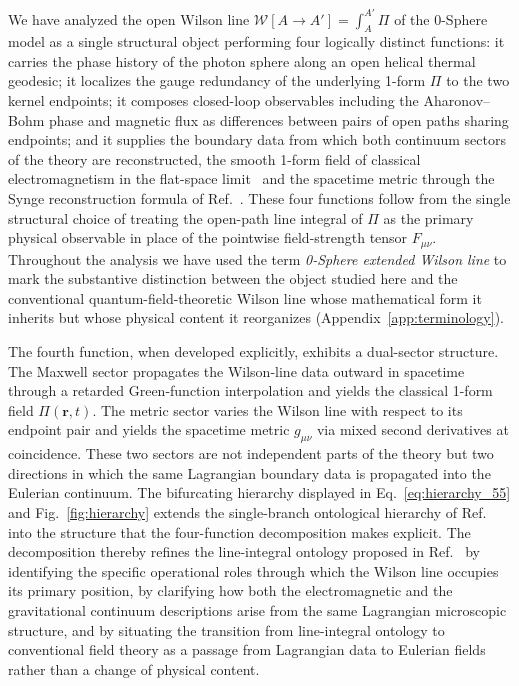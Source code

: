 \documentclass[%
 reprint, amsmath,amssymb, aps, prb, ]{revtex4-2}
\numberwithin{equation}{section}
\newcommand{\WL}{\mathcal{W}}
\begin{document}
We have analyzed the open Wilson line $\WL[A \to A'] = \int_A^{A'}\Pi$ of the 0-Sphere model as a single structural object performing four logically distinct functions: it carries the phase history of the photon sphere along an open helical thermal geodesic; it localizes the gauge redundancy of the underlying 1-form $\Pi$ to the two kernel endpoints; it composes closed-loop observables including the Aharonov--Bohm phase and magnetic flux as differences between pairs of open paths sharing endpoints; and it supplies the boundary data from which both continuum sectors of the theory are reconstructed, the smooth 1-form field of classical electromagnetism in the flat-space limit~\cite{hanamura54} and the spacetime metric through the Synge reconstruction formula of Ref.~\cite{hanamura51}. These four functions follow from the single structural choice of treating the open-path line integral of $\Pi$ as the primary physical observable in place of the pointwise field-strength tensor $F_{\mu\nu}$. Throughout the analysis we have used the term \emph{0-Sphere extended Wilson line} to mark the substantive distinction between the object studied here and the conventional quantum-field-theoretic Wilson line whose mathematical form it inherits but whose physical content it reorganizes (Appendix~\ref{app:terminology}).

The fourth function, when developed explicitly, exhibits a dual-sector structure. The Maxwell sector propagates the Wilson-line data outward in spacetime through a retarded Green-function interpolation and yields the classical 1-form field $\Pi(\mathbf{r},t)$. The metric sector varies the Wilson line with respect to its endpoint pair and yields the spacetime metric $g_{\mu\nu}$ via mixed second derivatives at coincidence. These two sectors are not independent parts of the theory but two directions in which the same Lagrangian boundary data is propagated into the Eulerian continuum. The bifurcating hierarchy displayed in Eq.~\eqref{eq:hierarchy_55} and Fig.~\ref{fig:hierarchy} extends the single-branch ontological hierarchy of Ref.~\cite{hanamura54} into the structure that the four-function decomposition makes explicit. The decomposition thereby refines the line-integral ontology proposed in Ref.~\cite{hanamura31} by identifying the specific operational roles through which the Wilson line occupies its primary position, by clarifying how both the electromagnetic and the gravitational continuum descriptions arise from the same Lagrangian microscopic structure, and by situating the transition from line-integral ontology to conventional field theory as a passage from Lagrangian data to Eulerian fields rather than a change of physical content.
\end{document}

